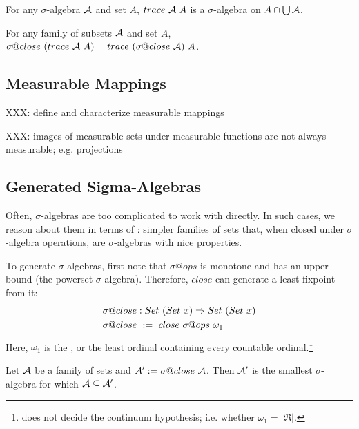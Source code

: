 \documentclass[preprint]{sigplanconf}
\begin{document}
\begin{lemma}
For any $\sigma$-algebra $\mathcal{A}$ and set $A$, $trace~\mathcal{A}~A$ is a $\sigma$-algebra on $A \cap \textstyle\bigcup\mathcal{A}$.
\end{lemma}

\begin{lemma}
For any family of subsets $\mathcal{A}$ and set $A$, $\sigma@close~(trace~\A~A) = trace~(\sigma@close~\A)~A$.
\label{lem:close-distributes-over-trace}
\end{lemma}


\subsection{Measurable Mappings}

XXX: define and characterize measurable mappings

XXX: images of measurable sets under measurable functions are not always measurable; e.g. projections

\subsection{Generated Sigma-Algebras}

Often, $\sigma$-algebras are too complicated to work with directly.
In such cases, we reason about them in terms of : simpler families of sets that, when closed under $\sigma$-algebra operations, are $\sigma$-algebras with nice properties.

To generate $\sigma$-algebras, first note that $\sigma@ops$ is monotone and has an upper bound (the powerset $\sigma$-algebra).
Therefore, $close$ can generate a least fixpoint from it:
\begin{equation}
\begin{aligned}
	&\sigma@close : Set~(Set~x) \tto Set~(Set~x) \\
	&\sigma@close \ := \ close~\sigma@ops~\omega_1
\end{aligned}
\end{equation}
Here, $\omega_1$ is the , or the least ordinal containing every countable ordinal.\footnote{\lzfclang does not decide the continuum hypothesis; i.e. whether $\omega_1 = |\Re|$.}

\begin{lemma}
Let $\mathcal{A}$ be a family of sets and $\A' := \sigma@close~\A$.
Then $\mathcal{A}'$ is the smallest $\sigma$-algebra for which $\mathcal{A} \subseteq \mathcal{A}'$.
\label{lem:generated-sigma-algebra}
\end{lemma}
\end{document}
